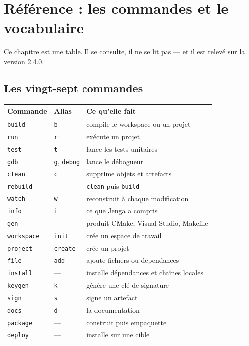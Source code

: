 \chapter{Référence : les commandes et le vocabulaire}

Ce chapitre est une table. Il se consulte, il ne se lit pas --- et il est relevé
sur la version 2.4.0.

\section{Les vingt-sept commandes}

\begin{center}
\begin{tabular}{@{}llp{6.6cm}@{}}
\toprule
\textbf{Commande} & \textbf{Alias} & \textbf{Ce qu'elle fait} \\
\midrule
\texttt{build} & \texttt{b} & compile le workspace ou un projet \\
\texttt{run} & \texttt{r} & exécute un projet \\
\texttt{test} & \texttt{t} & lance les tests unitaires \\
\texttt{gdb} & \texttt{g}, \texttt{debug} & lance le débogueur \\
\texttt{clean} & \texttt{c} & supprime objets et artefacts \\
\texttt{rebuild} & --- & \texttt{clean} puis \texttt{build} \\
\texttt{watch} & \texttt{w} & reconstruit à chaque modification \\
\texttt{info} & \texttt{i} & ce que Jenga a compris \\
\texttt{gen} & --- & produit CMake, Visual Studio, Makefile \\
\texttt{workspace} & \texttt{init} & crée un espace de travail \\
\texttt{project} & \texttt{create} & crée un projet \\
\texttt{file} & \texttt{add} & ajoute fichiers ou dépendances \\
\texttt{install} & --- & installe dépendances et chaînes locales \\
\texttt{keygen} & \texttt{k} & génère une clé de signature \\
\texttt{sign} & \texttt{s} & signe un artefact \\
\texttt{docs} & \texttt{d} & la documentation \\
\texttt{package} & --- & construit puis empaquette \\
\texttt{deploy} & --- & installe sur une cible \\

\end{tabular}
\end{center}
